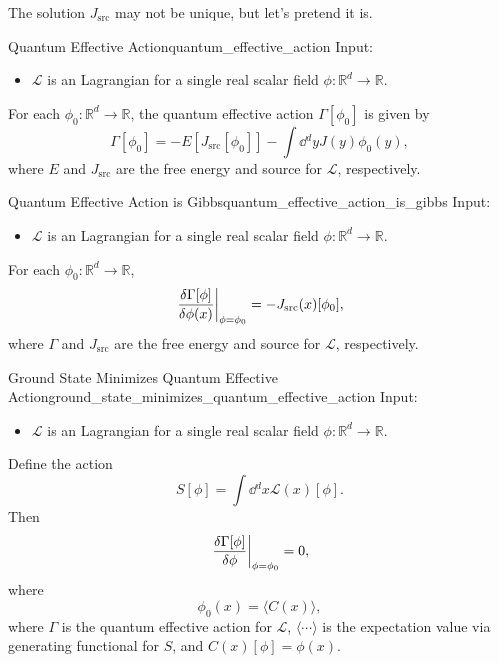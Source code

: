 \documentclass{article}
\begin{document}
The solution $J_{\mathrm{src}}$ may not be unique, but let's pretend it is.

\begin{definition}{Quantum Effective Action}{quantum_effective_action}
    Input:
    \begin{itemize}
        \item $\mathcal{L}$ is an Lagrangian for a single real scalar field $\phi: \mathbb{R}^d \rightarrow \mathbb{R}$.
    \end{itemize}
    For each $\phi_0: \mathbb{R}^d \rightarrow \mathbb{R}$, the quantum effective action $\Gamma[\phi_0]$ is given by
    \[ \Gamma[\phi_0] = -E[J_{\mathrm{src}}[\phi_0]] - \int \dd{^d y} J(y) \phi_{0}(y), \]
    where $E$ and $J_{\mathrm{src}}$ are the free energy and source for $\mathcal{L}$, respectively.
\end{definition}

\begin{theorem}{Quantum Effective Action is Gibbs}{quantum_effective_action_is_gibbs}
    Input:
    \begin{itemize}
        \item $\mathcal{L}$ is an Lagrangian for a single real scalar field $\phi: \mathbb{R}^d \rightarrow \mathbb{R}$.
    \end{itemize}
    For each $\phi_0: \mathbb{R}^d \rightarrow \mathbb{R}$,
    \[ \eval{\frac{\delta \Gamma[\phi]}{\delta \phi(x)}}_{\phi = \phi_0} = -J_{\mathrm{src}}(x)[\phi_0], \]
    where $\Gamma$ and $J_{\mathrm{src}}$ are the free energy and source for $\mathcal{L}$, respectively.
\end{theorem}

\begin{corollary}{Ground State Minimizes Quantum Effective Action}{ground_state_minimizes_quantum_effective_action}
    Input:
    \begin{itemize}
        \item $\mathcal{L}$ is an Lagrangian for a single real scalar field $\phi: \mathbb{R}^d \rightarrow \mathbb{R}$.
    \end{itemize}
    Define the action
    \[ S[\phi] = \int \dd{^d x} \mathcal{L}(x)[\phi]. \]
    Then
    \[ \eval{\frac{\delta \Gamma[\phi]}{\delta \phi}}_{\phi = \phi_0} = 0, \]
    where
    \[ \phi_0(x) = \langle C(x) \rangle, \]
    where $\Gamma$ is the quantum effective action for $\mathcal{L}$, $\langle \cdots \rangle$ is the expectation value via generating functional for $S$, and $C(x)[\phi] = \phi(x)$.
\end{corollary}
\end{document}
